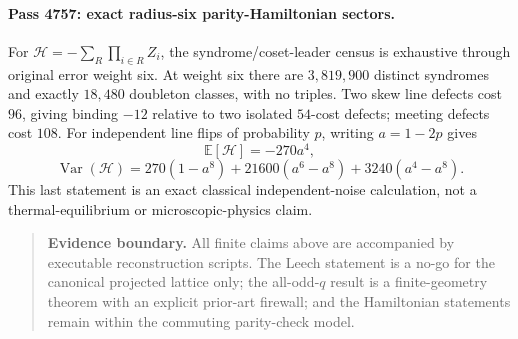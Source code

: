 \paragraph{Pass 4757: exact radius-six parity-Hamiltonian sectors.}
For $\mathcal H=-\sum_R\prod_{i\in R}Z_i$, the syndrome/coset-leader census is
exhaustive through original error weight six.  At weight six there are
$3{,}819{,}900$ distinct syndromes and exactly $18{,}480$ doubleton classes,
with no triples.  Two skew line defects cost $96$, giving binding $-12$
relative to two isolated $54$-cost defects; meeting defects cost $108$.  For
independent line flips of probability $p$, writing $a=1-2p$ gives
\[
 \mathbb E[\mathcal H]=-270a^4,
\]
\[
 \operatorname{Var}(\mathcal H)=270(1-a^8)+21600(a^6-a^8)+3240(a^4-a^8).
\]
This last statement is an exact classical independent-noise calculation, not a
thermal-equilibrium or microscopic-physics claim.

\begin{quote}\small
\textbf{Evidence boundary.}  All finite claims above are accompanied by executable
reconstruction scripts.  The Leech statement is a no-go for the canonical
projected lattice only; the all-odd-$q$ result is a finite-geometry theorem with
an explicit prior-art firewall; and the Hamiltonian statements remain within
the commuting parity-check model.
\end{quote}
